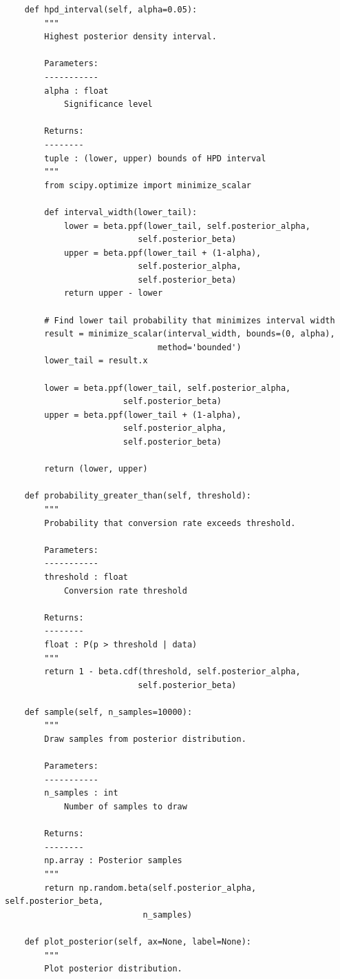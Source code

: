 \begin{lstlisting}
    def hpd_interval(self, alpha=0.05):
        """
        Highest posterior density interval.

        Parameters:
        -----------
        alpha : float
            Significance level

        Returns:
        --------
        tuple : (lower, upper) bounds of HPD interval
        """
        from scipy.optimize import minimize_scalar

        def interval_width(lower_tail):
            lower = beta.ppf(lower_tail, self.posterior_alpha,
                           self.posterior_beta)
            upper = beta.ppf(lower_tail + (1-alpha),
                           self.posterior_alpha,
                           self.posterior_beta)
            return upper - lower

        # Find lower tail probability that minimizes interval width
        result = minimize_scalar(interval_width, bounds=(0, alpha),
                               method='bounded')
        lower_tail = result.x

        lower = beta.ppf(lower_tail, self.posterior_alpha,
                        self.posterior_beta)
        upper = beta.ppf(lower_tail + (1-alpha),
                        self.posterior_alpha,
                        self.posterior_beta)

        return (lower, upper)

    def probability_greater_than(self, threshold):
        """
        Probability that conversion rate exceeds threshold.

        Parameters:
        -----------
        threshold : float
            Conversion rate threshold

        Returns:
        --------
        float : P(p > threshold | data)
        """
        return 1 - beta.cdf(threshold, self.posterior_alpha,
                           self.posterior_beta)

    def sample(self, n_samples=10000):
        """
        Draw samples from posterior distribution.

        Parameters:
        -----------
        n_samples : int
            Number of samples to draw

        Returns:
        --------
        np.array : Posterior samples
        """
        return np.random.beta(self.posterior_alpha, self.posterior_beta,
                            n_samples)

    def plot_posterior(self, ax=None, label=None):
        """
        Plot posterior distribution.


\end{lstlisting}
